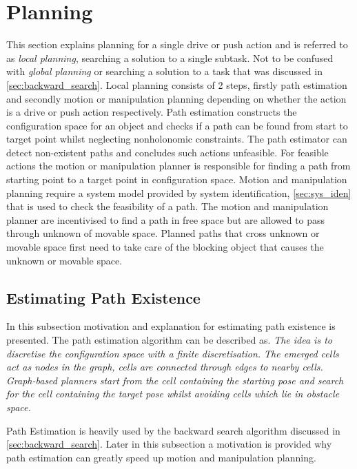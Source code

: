 \section{Planning}%
\label{sec:planning}
This section explains planning for a single drive or push action and is referred to as \textit{local planning}, searching a solution to a single subtask. Not to be confused with \textit{global planning} or searching a solution to a task that was discussed in \cref{sec:backward_search}. Local planning consists of 2 steps, firstly path estimation and secondly motion or manipulation planning depending on whether the action is a drive or push action respectively. Path estimation constructs the configuration space for an object and checks if a path can be found from start to target point whilst neglecting nonholonomic constraints. The path estimator can detect non-existent paths and concludes such actions unfeasible. For feasible actions the motion or manipulation planner is responsible for finding a path from starting point to a target point in configuration space. Motion and manipulation planning require a system model provided by system identification, \cref{sec:sys_iden} that is used to check the feasibility of a path. The motion and manipulation planner are incentivised to find a path in free space but are allowed to pass through unknown of movable space. Planned paths that cross unknown or movable space first need to take care of the blocking object that causes the unknown or movable space.\bs

\subsection{Estimating Path Existence}%
\label{subsec:path_estimation}
In this subsection motivation and explanation for estimating path existence is presented. The path estimation algorithm can be described as. \textit{The idea is to discretise the configuration space with a finite discretisation. The emerged cells act as nodes in the graph, cells are connected through edges to nearby cells. Graph-based planners start from the cell containing the starting pose and search for the cell containing the target pose whilst avoiding cells which lie in obstacle space.\bs}

Path Estimation is heavily used by the backward search algorithm discussed in \cref{sec:backward_search}. Later in this subsection a motivation is provided why path estimation can greatly speed up motion and manipulation planning.

